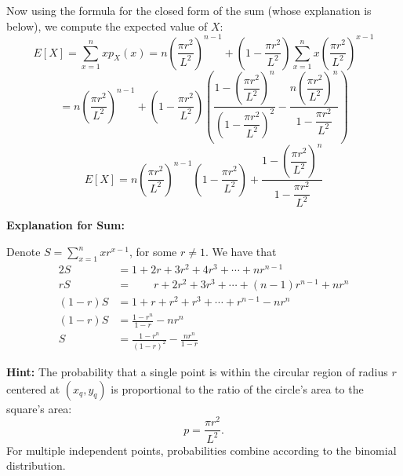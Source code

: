 \documentclass{assignment-263}
\begin{document}
\begin{enumerate}
\begin{enumerate}
    Now using the formula for the closed form of the sum (whose explanation is below), we compute the expected value of \(X\):
    \[
      E[X] = \sum_{x=1}^{n} x p_X(x) = n\left( \dfrac{\pi r^2}{L^2} \right)^{n-1} + \left( 1 - \dfrac{\pi r^2}{L^2} \right)\sum_{x=1}^{n} x\left( \dfrac{\pi r^2}{L^2} \right)^{x - 1}
    \]
    \[
      = n\left( \dfrac{\pi r^2}{L^2} \right)^{n-1} + \left( 1 - \dfrac{\pi r^2}{L^2} \right) \left( \frac{ 1 - \left( \dfrac{\pi r^2}{L^2} \right)^n}{\left( 1 - \dfrac{\pi r^2}{L^2} \right)^2} - \frac{n\left( \dfrac{\pi r^2}{L^2} \right)^n}{1 - \dfrac{\pi r^2}{L^2}} \right) 
    \]
    \[
      E[X] = n\left( \dfrac{\pi r^2}{L^2} \right)^{n-1}\left( 1 - \dfrac{\pi r^2}{L^2} \right) + \frac{ 1 - \left( \dfrac{\pi r^2}{L^2} \right)^n}{1 - \dfrac{\pi r^2}{L^2}}
    \]
    \bigskip

    \textbf{Explanation for Sum:}

    Denote \(S = \sum_{x=1}^{n} xr^{x - 1}\), for some \(r \neq 1\). We have that
    \begin{alignat*}{2}
      S &= 1 + 2r + 3r^2 + 4r^3 + \cdots + nr^{n-1} \\
      rS &= \qquad r + 2r^2 + 3r^3 + \cdots + {(n-1)r^{n-1}} + nr^n \\
      (1 - r)S &= 1 + r + r^2 + r^3 + \cdots + r^{n-1} - nr^n \\
      (1 - r)S &= \frac{1 - r^n}{1 - r} - nr^n \\
      S &= \frac{1 - r^n}{(1-r)^2} - \frac{nr^n}{1-r}
    \end{alignat*}
\end{enumerate}

\end{enumerate}

\bigskip

\noindent \textbf{Hint:} The probability that a single point is within the circular region of radius $r$ centered at $(x_q, y_q)$ is proportional to the ratio of the circle's area to the square's area:
\[
p = \frac{\pi r^2}{L^2}.
\]
For multiple independent points, probabilities combine according to the binomial distribution.

\program
\end{document}
